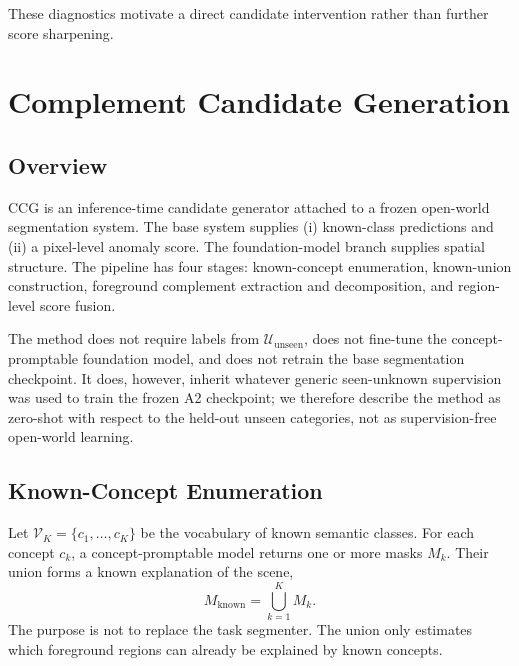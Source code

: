 \documentclass[journal]{IEEEtai}
\newcommand{\cUu}{\mathcal{U}_{\mathrm{unseen}}}
\newcommand{\CCG}{\textsc{CCG}\xspace}
\begin{document}
\begin{table}[t]
\centering
\caption{Existing proposal/refinement diagnostics on Synapse A2.}
\label{tab:proposal_diag}
\footnotesize
{}%
\end{table}

These diagnostics motivate a direct candidate intervention rather than further score sharpening.

\section{Complement Candidate Generation}
\label{sec:method}

\subsection{Overview}
\CCG is an inference-time candidate generator attached to a frozen open-world segmentation system. The base system supplies (i) known-class predictions and (ii) a pixel-level anomaly score. The foundation-model branch supplies spatial structure. The pipeline has four stages: known-concept enumeration, known-union construction, foreground complement extraction and decomposition, and region-level score fusion.

The method does not require labels from $\cUu$, does not fine-tune the concept-promptable foundation model, and does not retrain the base segmentation checkpoint. It does, however, inherit whatever generic seen-unknown supervision was used to train the frozen A2 checkpoint; we therefore describe the method as zero-shot with respect to the held-out unseen categories, not as supervision-free open-world learning.

\subsection{Known-Concept Enumeration}
Let $\mathcal{V}_{K}=\{c_1,\ldots,c_K\}$ be the vocabulary of known semantic classes. For each concept $c_k$, a concept-promptable model returns one or more masks $M_k$. Their union forms a known explanation of the scene,
\begin{equation}
  M_{\mathrm{known}} = \bigcup_{k=1}^{K} M_k.
\end{equation}
The purpose is not to replace the task segmenter. The union only estimates which foreground regions can already be explained by known concepts.
\end{document}
